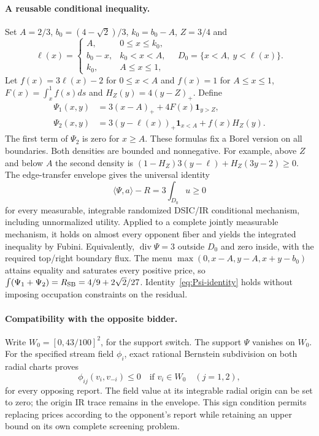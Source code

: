 \label{sec:common-upper}
\paragraph{A reusable conditional inequality.}
Set $A=2/3$, $b_0=(4-\sqrt2)/3$, $k_0=b_0-A$, $Z=3/4$ and
\[
 \ell(x)=\begin{cases}
 A,&0\le x\le k_0,\\
 b_0-x,&k_0<x<A,\\
 k_0,&A\le x\le1,
 \end{cases}
 \quad D_0=\{x<A,\ y<\ell(x)\}.
\]
Let $f(x)=3\ell(x)-2$ for $0\le x<A$ and $f(x)=1$ for $A\le x\le1$,
$F(x)=\int_x^1 f(s)ds$ and $H_Z(y)=4(y-Z)_+$. Define
\begin{equation}\label{eq:reusable-Psi}
\begin{split}
 \Psi_1(x,y)&=3(x-A)_++4F(x)\mathbf1_{y>Z},\\
 \Psi_2(x,y)&=3(y-\ell(x))_+\mathbf1_{x<A}+f(x)H_Z(y).
\end{split}
\end{equation}
The first term of $\Psi_2$ is zero for $x\ge A$. These formulas fix a
Borel version on all boundaries. Both densities are bounded and nonnegative. For
example, above $Z$ and below $A$ the second density is
$(1-H_Z)3(y-\ell)+H_Z(3y-2)\ge0$.
The edge-transfer envelope gives the universal identity
\begin{equation}\label{eq:Psi-identity}
 \langle\Psi,a\rangle-R=3\int_{D_0}u\ge0
\end{equation}
for every measurable, integrable randomized DSIC/IR conditional mechanism,
including unnormalized utility. Applied to a complete jointly measurable
mechanism, it holds on almost every opponent fiber and yields the integrated
inequality by Fubini. Equivalently, $\operatorname{div}\Psi=3$ outside
$D_0$ and zero inside, with the required top/right boundary flux.
The menu $\max(0,x-A,y-A,x+y-b_0)$ attains equality and saturates every
positive price, so $\int(\Psi_1+\Psi_2)=R_{\rm SB}=4/9+2\sqrt2/27$.
Identity~\eqref{eq:Psi-identity} holds without imposing
occupation constraints on the residual.

\paragraph{Compatibility with the opposite bidder.}
Write $W_0=[0,43/100]^2$, for the support switch. The support $\Psi$ vanishes on $W_0$. For the specified
stream field $\phi_i$, exact rational Bernstein subdivision on both
radial charts proves
\[
 \phi_{ij}(v_i,v_{-i})\le0\quad\text{if }v_i\in W_0
 \quad(j=1,2),
\]
for every opposing report. The field value at its integrable radial
origin can be set to zero; the origin IR trace remains in the envelope.
This sign condition permits replacing prices according to the opponent's
report while retaining an upper bound on its own complete screening problem.

